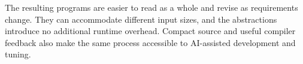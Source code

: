 The resulting programs are easier to read as a whole and revise as requirements change. They can accommodate different input sizes, and the abstractions introduce no additional runtime overhead. Compact source and useful compiler feedback also make the same process accessible to AI-assisted development and tuning.
